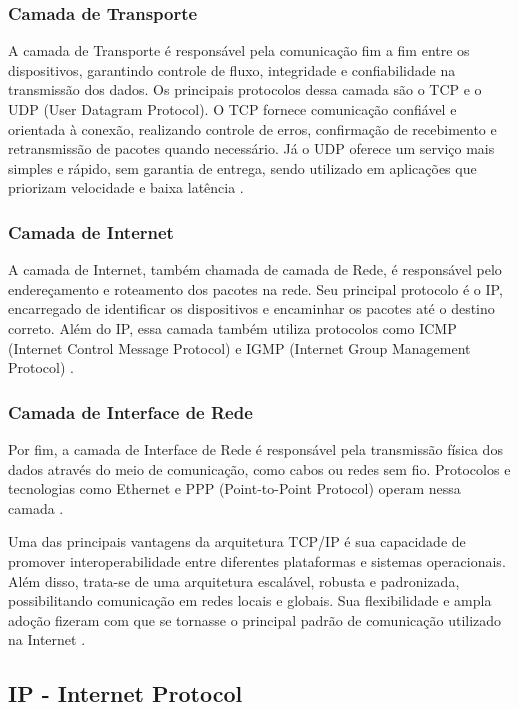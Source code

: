 \documentclass[
    12pt,                %
    openright,           %
    oneside,             %
    a4paper,             %
    english,             %
    brazil               %
]{abntex2}
\begin{document}
\subsubsection{Camada de Transporte}
A camada de Transporte é responsável pela comunicação fim a fim entre os dispositivos, garantindo controle de fluxo, integridade e confiabilidade na transmissão dos dados. Os principais protocolos dessa camada são o TCP e o UDP (User Datagram Protocol). O TCP fornece comunicação confiável e orientada à conexão, realizando controle de erros, confirmação de recebimento e retransmissão de pacotes quando necessário. Já o UDP oferece um serviço mais simples e rápido, sem garantia de entrega, sendo utilizado em aplicações que priorizam velocidade e baixa latência \cite{Stevens1994,ESR2020}.

\subsubsection{Camada de Internet}
A camada de Internet, também chamada de camada de Rede, é responsável pelo endereçamento e roteamento dos pacotes na rede. Seu principal protocolo é o IP, encarregado de identificar os dispositivos e encaminhar os pacotes até o destino correto. Além do IP, essa camada também utiliza protocolos como ICMP (Internet Control Message Protocol) e IGMP (Internet Group Management Protocol) \cite{Stevens1994,ESR2020}.

\subsubsection{Camada de Interface de Rede}
Por fim, a camada de Interface de Rede é responsável pela transmissão física dos dados através do meio de comunicação, como cabos ou redes sem fio. Protocolos e tecnologias como Ethernet e PPP (Point-to-Point Protocol) operam nessa camada \cite{Stevens1994,ESR2020}.


Uma das principais vantagens da arquitetura TCP/IP é sua capacidade de promover interoperabilidade entre diferentes plataformas e sistemas operacionais. Além disso, trata-se de uma arquitetura escalável, robusta e padronizada, possibilitando comunicação em redes locais e globais. Sua flexibilidade e ampla adoção fizeram com que se tornasse o principal padrão de comunicação utilizado na Internet \cite{Stevens1994,ESR2020}.

\subsection{IP - Internet Protocol}
\end{document}
